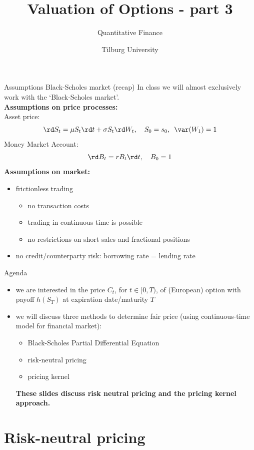 \documentclass[pdf, handout]{beamer}
\title{Valuation of Options - part 3}
\subtitle{Quantitative Finance}
\author{Tilburg University}
\institute{Ramon van den Akker}
\date{}
\begin{document}
\begin{frame}
\titlepage
\end{frame}

\begin{frame}{Assumptions  Black-Scholes market (recap)}
In class we will almost exclusively work with the `Black-Scholes market'.
\\ \vspace{.5cm}
\textbf{Assumptions on price processes:} \\
Asset price:
\[
\rd S_t=\mu S_t \rd t + \sigma S_t \rd W_t,\quad S_0=s_0,\,\,\, \var(W_1) = 1
\]
Money Market Account:
\[
\rd B_t= r B_t \rd t,\quad B_0=1
\]
\textbf{Assumptions on market:} \\
\begin{itemize}
\item frictionless trading
\begin{itemize}
\item no transaction costs
\item trading in continuous-time is possible
\item no restrictions on short sales and fractional positions
\end{itemize}
\item no credit/counterparty risk: borrowing rate = lending rate
\end{itemize}
\end{frame}

\begin{frame}{Agenda}
\begin{itemize}
\item we are interested in the price $C_t$, for $t\in [0,T)$, of (European) option with payoff $h(S_T)$ at expiration date/maturity $T$
\item we will discuss three methods to determine fair price (using continuous-time model for financial market):
\begin{itemize}
\item Black-Scholes Partial Differential Equation
\item risk-neutral pricing
\item pricing kernel
\end{itemize}
\textbf{These slides discuss risk neutral pricing and the pricing kernel approach.} 
\end{itemize}
\end{frame}


\section{Risk-neutral pricing}
\end{document}
